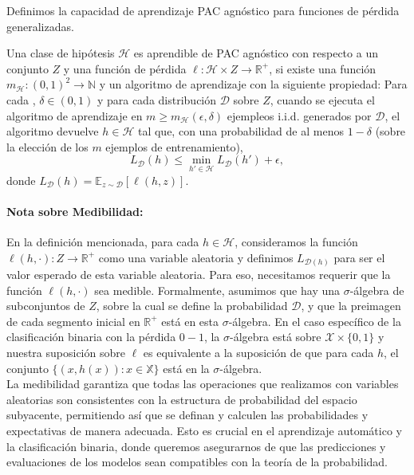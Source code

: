 Definimos la capacidad de aprendizaje PAC agnóstico para funciones de pérdida generalizadas.\\

\begin{def.} Una clase de hipótesis $\mathcal{H}$ es aprendible de PAC agnóstico con respecto a un conjunto $Z$ y una función de pérdida $\ell: \mathcal{H}\times  Z \to \mathbb{R}^+$, si existe una función $m_{\mathcal{H}}: (0, 1)^2 \to \mathbb{N}$ y un algoritmo de aprendizaje con la siguiente propiedad: Para cada , $\delta \in (0, 1)$ y para cada distribución $\mathcal{D}$ sobre $Z$, cuando se ejecuta el algoritmo de aprendizaje en $m \geq m_{\mathcal{H}}(\epsilon, \delta)$ ejempleos i.i.d. generados por $\mathcal{D}$, el algoritmo devuelve $h \in \mathcal{H}$ tal que, con una probabilidad de al menos $1 - \delta$ (sobre la elección de los $m$ ejemplos de entrenamiento), 
    $$L_{\mathcal{D}}(h) \leq \min_{h'\in \mathcal{H}} L_{\mathcal{D}}(h') + \epsilon,$$
    donde $L_{\mathcal{D}}(h) = \mathbb{E}_{z\sim \mathcal{D}}[\ell(h, z)]$.
\end{def.}

\paragraph{Nota sobre Medibilidad:}

En la definición mencionada, para cada $h \in \mathcal{H}$, consideramos la función $\ell(h, \cdot) : Z \rightarrow \mathbb{R}^+$ como una variable aleatoria y definimos $L_{\mathcal{D}(h)}$ para ser el valor esperado de esta variable aleatoria. Para eso, necesitamos requerir que la función $\ell(h, \cdot)$ sea medible. Formalmente, asumimos que hay una $\sigma$-álgebra de subconjuntos de $Z$, sobre la cual se define la probabilidad $\mathcal{D}$, y que la preimagen de cada segmento inicial en $\mathbb{R}^+$ está en esta $\sigma$-álgebra. En el caso específico de la clasificación binaria con la pérdida $0-1$, la $\sigma$-álgebra está sobre $\mathcal{X} \times \{0, 1\}$ y nuestra suposición sobre $\ell$ es equivalente a la suposición de que para cada $h$, el conjunto $\{(x, h(x)) : x \in \mathbb{X} \}$ está en la $\sigma$-álgebra.\\


La medibilidad garantiza que todas las operaciones que realizamos con variables aleatorias son consistentes con la estructura de probabilidad del espacio subyacente, permitiendo así que se definan y calculen las probabilidades y expectativas de manera adecuada. Esto es crucial en el aprendizaje automático y la clasificación binaria, donde queremos asegurarnos de que las predicciones y evaluaciones de los modelos sean compatibles con la teoría de la probabilidad.


